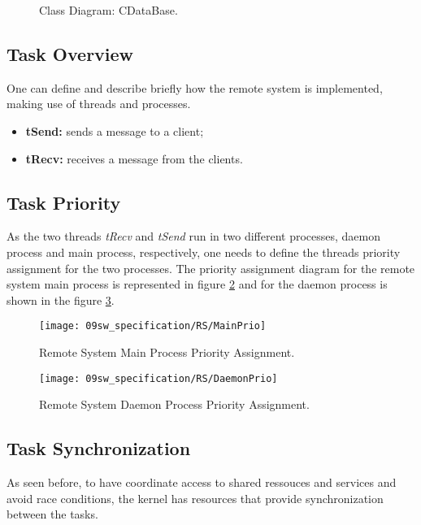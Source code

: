 \begin{figure}[H]
	\centering
	\caption{Class Diagram: CDataBase.}
	\label{fig:CDataBase}
\end{figure}

\subsection{Task Overview}
One can define and describe briefly how the remote system is implemented, making use of threads and processes. 

\begin{itemize}
	\item \textbf{tSend:} sends a message to a client;
	\item \textbf{tRecv:} receives a message from the clients.
\end{itemize}

\subsection{Task Priority}
As the two threads \textit{tRecv} and \textit{tSend} run in two different processes, daemon process and main process, respectively, one needs to define the threads priority assignment for the two processes. The priority assignment diagram for the remote system main process is represented in figure \ref{fig:rsMainPrio} and for the daemon process is shown in the figure \ref{fig:rsDaemonPrio}. 

\begin{figure}[H]
	\centering
	\texttt{[image: 09sw\_specification/RS/MainPrio]}
	\caption{Remote System Main Process Priority Assignment.}
	\label{fig:rsMainPrio}
\end{figure}

\begin{figure}[H]
	\centering
	\texttt{[image: 09sw\_specification/RS/DaemonPrio]}
	\caption{Remote System Daemon Process Priority Assignment.}
	\label{fig:rsDaemonPrio}
\end{figure}

\subsection{Task Synchronization}
As seen before, to have coordinate access to shared ressouces and services and avoid race conditions, the kernel has resources that provide synchronization between the tasks. 

